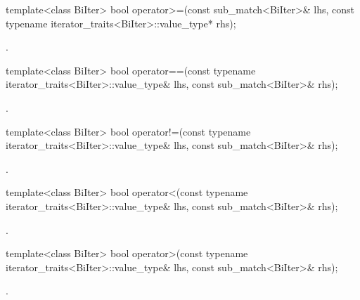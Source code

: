 %
\begin{itemdecl}
template<class BiIter>
  bool operator>=(const sub_match<BiIter>& lhs,
                  const typename iterator_traits<BiIter>::value_type* rhs);
\end{itemdecl}

\begin{itemdescr}
\pnum\returns {}.
\end{itemdescr}

%
\begin{itemdecl}
template<class BiIter>
  bool operator==(const typename iterator_traits<BiIter>::value_type& lhs,
                  const sub_match<BiIter>& rhs);
\end{itemdecl}

\begin{itemdescr}
\pnum
\returns {}.
\end{itemdescr}

%
\begin{itemdecl}
template<class BiIter>
  bool operator!=(const typename iterator_traits<BiIter>::value_type& lhs,
                  const sub_match<BiIter>& rhs);
\end{itemdecl}

\begin{itemdescr}
\pnum
\returns {}.
\end{itemdescr}

%
\begin{itemdecl}
template<class BiIter>
  bool operator<(const typename iterator_traits<BiIter>::value_type& lhs,
                 const sub_match<BiIter>& rhs);
\end{itemdecl}

\begin{itemdescr}
\pnum
\returns {}.
\end{itemdescr}

%
\begin{itemdecl}
template<class BiIter>
  bool operator>(const typename iterator_traits<BiIter>::value_type& lhs,
                 const sub_match<BiIter>& rhs);
\end{itemdecl}

\begin{itemdescr}
\pnum
\returns {}.
\end{itemdescr}

